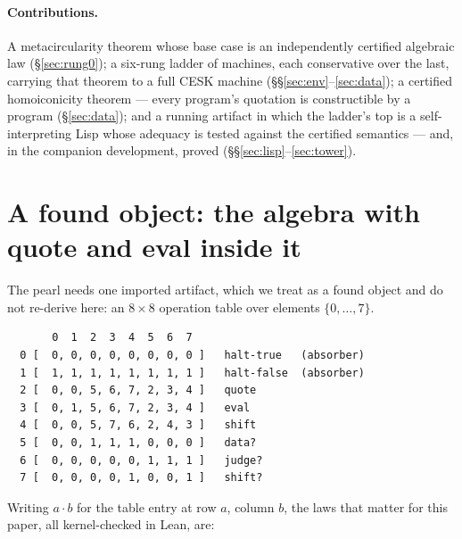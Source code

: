 \documentclass[acmsmall,screen,review]{acmart}
\begin{document}
\paragraph{Contributions.} A metacircularity theorem whose base case
is an independently certified algebraic law
(\S\ref{sec:rung0}); a six-rung ladder of machines, each conservative
over the last, carrying that theorem to a full CESK machine
(\S\S\ref{sec:env}--\ref{sec:data}); a certified homoiconicity
theorem --- every program's quotation is constructible by a program
(\S\ref{sec:data}); and a running artifact in which the ladder's
top is a self-interpreting Lisp whose adequacy is tested against the
certified semantics --- and, in the companion development, proved
(\S\S\ref{sec:lisp}--\ref{sec:tower}).

\section{A found object: the algebra with quote and eval inside it}
\label{sec:table}

The pearl needs one imported artifact, which we treat as a found
object and do not re-derive here: an $8\times 8$ operation table over
elements $\{0,\dots,7\}$.

\begin{lstlisting}
       0  1  2  3  4  5  6  7
  0 [  0, 0, 0, 0, 0, 0, 0, 0 ]   halt-true   (absorber)
  1 [  1, 1, 1, 1, 1, 1, 1, 1 ]   halt-false  (absorber)
  2 [  0, 0, 5, 6, 7, 2, 3, 4 ]   quote
  3 [  0, 1, 5, 6, 7, 2, 3, 4 ]   eval
  4 [  0, 0, 5, 7, 6, 2, 4, 3 ]   shift
  5 [  0, 0, 1, 1, 1, 0, 0, 0 ]   data?
  6 [  0, 0, 0, 0, 0, 1, 1, 1 ]   judge?
  7 [  0, 0, 0, 0, 1, 0, 0, 1 ]   shift?
\end{lstlisting}

Writing $a \cdot b$ for the table entry at row $a$, column $b$, the
laws that matter for this paper, all kernel-checked in Lean, are:
\end{document}
